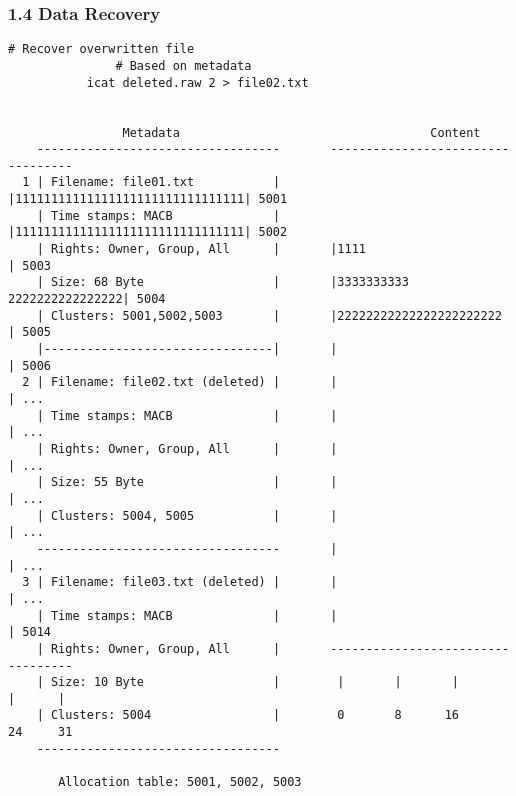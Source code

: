 \begin{frame}[fragile]
  \frametitle{1.4 Data Recovery}
  \begin{lstlisting}[basicstyle=\tiny\ttfamily]
	       # Recover overwritten file
               # Based on metadata
	       icat deleted.raw 2 > file02.txt
                            

                Metadata                                   Content     
    ----------------------------------       ----------------------------------
  1 | Filename: file01.txt           |       |11111111111111111111111111111111| 5001
    | Time stamps: MACB              |       |11111111111111111111111111111111| 5002
    | Rights: Owner, Group, All      |       |1111                            | 5003
    | Size: 68 Byte                  |       |3333333333      2222222222222222| 5004
    | Clusters: 5001,5002,5003       |       |22222222222222222222222         | 5005
    |--------------------------------|       |                                | 5006
  2 | Filename: file02.txt (deleted) |       |                                | ...
    | Time stamps: MACB              |       |                                | ...
    | Rights: Owner, Group, All      |       |                                | ...
    | Size: 55 Byte                  |       |                                | ...
    | Clusters: 5004, 5005           |       |                                | ...
    ----------------------------------       |                                | ...
  3 | Filename: file03.txt (deleted) |       |                                | ...
    | Time stamps: MACB              |       |                                | 5014
    | Rights: Owner, Group, All      |       ----------------------------------
    | Size: 10 Byte                  |        |       |       |       |      |
    | Clusters: 5004                 |        0       8      16      24     31
    ----------------------------------

       Allocation table: 5001, 5002, 5003
  \end{lstlisting}
\end{frame}


